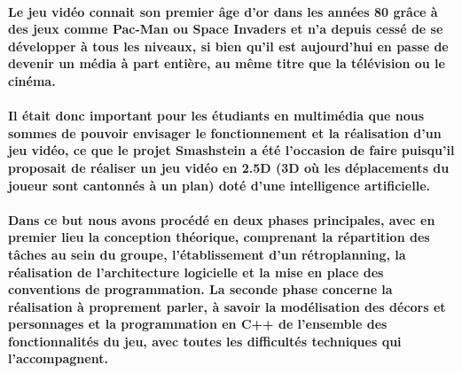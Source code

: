 \paragraph{Le jeu vidéo connait son premier âge d’or dans les années 80 grâce à des jeux comme Pac-Man ou Space Invaders et n’a depuis cessé de se développer à tous les niveaux, si bien qu’il est aujourd’hui en passe de devenir un média à part entière, au même titre que la télévision ou le cinéma.}

\paragraph{Il était donc important pour les étudiants en multimédia que nous sommes de pouvoir envisager le fonctionnement et la réalisation d’un jeu vidéo, ce que le projet Smashstein a été l’occasion de faire puisqu’il proposait de réaliser un jeu vidéo en 2.5D (3D où les déplacements du joueur sont cantonnés à un plan) doté d’une intelligence artificielle.}

\paragraph{Dans ce but nous avons procédé en deux phases principales, avec en premier lieu la \textbf{conception théorique}, comprenant la \textbf{répartition des tâches} au sein du groupe, l’\textbf{établissement d’un rétroplanning}, la réalisation de l’\textbf{architecture logicielle} et la \textbf{mise en place des conventions} de programmation. La seconde phase concerne la \textbf{réalisation} à proprement parler, à savoir la \textbf{modélisation des décors et personnages} et la \textbf{programmation en C++ de l'ensemble des fonctionnalités du jeu}, avec toutes les \textbf{difficultés techniques} qui l'accompagnent.}